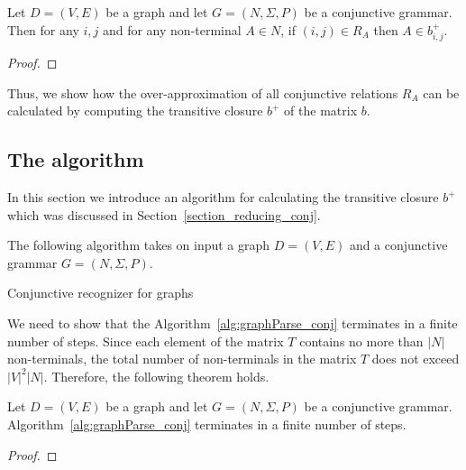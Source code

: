 \begin{mytheorem}\label{thm:correct_conj}
 Let $D = (V,E)$ be a graph and let $G =(N,\Sigma,P)$ be a conjunctive grammar. Then for any $i, j$ and for any non-terminal $A \in N$, if $(i,j) \in R_A$ then $A \in b^+_{i,j}$.
\end{mytheorem}
\begin{proof}
\end{proof}

Thus, we show how the over-approximation of all conjunctive relations $R_A$ can be calculated by computing the transitive closure $b^+$ of the matrix $b$.



\subsection{The algorithm} \label{section_algorithm_conj}
In this section we introduce an algorithm for calculating the transitive closure $b^+$ which was discussed in Section~\ref{section_reducing_conj}.

The following algorithm takes on input a graph $D = (V, E)$ and a conjunctive grammar $G = (N,\Sigma,P)$.

\begin{algorithm}[H]
\begin{algorithmic}[1]
\caption{Conjunctive recognizer for graphs}
\label{alg:graphParse_conj}
    
\EndFunction
\end{algorithmic}
\end{algorithm}

We need to show that the Algorithm~\ref{alg:graphParse_conj} terminates in a finite number of steps. Since each element of the matrix $T$ contains no more than $|N|$ non-terminals, the total number of non-terminals in the matrix $T$ does not exceed $|V|^2|N|$. Therefore, the following theorem holds.

\begin{mytheorem}\label{thm:finite_conj}
 Let $D = (V,E)$ be a graph and let $G =(N,\Sigma,P)$ be a conjunctive grammar. Algorithm~\ref{alg:graphParse_conj} terminates in a finite number of steps. 
\end{mytheorem}
\begin{proof}
\end{proof}
